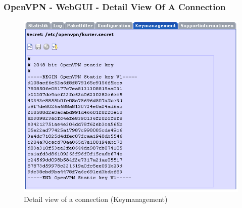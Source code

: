 \subsubsection{OpenVPN - WebGUI - Detail View Of A Connection}
  \begin{figure}[!h]
    \centering
    \includegraphics[width=400pt]{detail}
    \caption{Detail view of a connection (Keymanagement)}
    \label{fig:guidetail}
  \end{figure}

